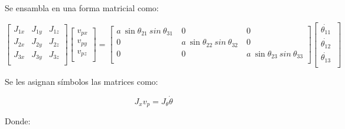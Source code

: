                         \vspace{-0.5cm}


            Se ensambla en una forma matricial como:
            
            \begin{equation*}
                 \left[ \begin{matrix}
                J_{1x}  &  J_{1y}  &  J_{1z}\\
                J_{2x}  &  J_{2y}  &  J_{2z}\\
                J_{3x}  &  J_{3y}  &  J_{3z}\\
                \end{matrix}
                 \right]  \left[ \begin{matrix}
                v_{px}\\
                v_{py}\\
                v_{pz}\\
                \end{matrix}
                 \right] = \left[ \begin{matrix}
                a~\sin  \theta _{21}~sin~ \theta _{31}~  &  0  &  0\\
                0  &  a~\sin  \theta _{22}~sin~ \theta _{32}~  &  0\\
                0  &  0  &  a~\sin  \theta _{23}~sin~ \theta _{33}\\
                \end{matrix}
                 \right]  \left[ \begin{matrix}
                \dot{ \theta _{11}}~\\
                \dot{ \theta _{12}}\\
                \dot{ \theta _{13}}~\\
                \end{matrix}
                 \right] 
            \end{equation*}
            
            Se les asignan símbolos las matrices como:
            
            \begin{equation}
                J_{x}v_{p}=J_{ \theta }\dot{ \theta }
            \label{eq:jac_met_a_anex_8}
            \end{equation}
            
            Donde:
            
